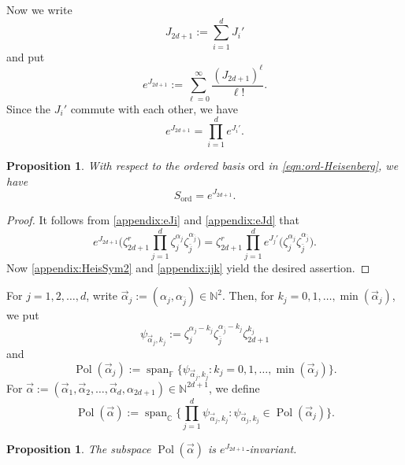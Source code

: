 \documentclass[a4paper,11pt,reqno]{amsart}
\newcommand{\0}{{\bf 0}}
\newcommand{\N}{\mathbb{N}}
\newcommand{\C}{\mathbb{C}}
\newcommand{\F}{\mathbb{F}}
\newcommand{\1}{{\bf 1}}
\DeclareMathOperator{\Span}{span}
\DeclareMathOperator{\Pol}{Pol}
\newcommand{\ord}{{\mathrm{ord}}}
\newcommand{\valpha}{\vec{\alpha}}
\theoremstyle{plain}
\newtheorem{proposition}[equation]{Proposition}
\theoremstyle{definition}
\numberwithin{equation}{section}
\theoremstyle{definition}
\begin{document}
\begin{appendices}
Now we write
\begin{equation*}
J_{2d+1}
:=
\sum_{i=1}^d J_i'
\end{equation*}
and put
\begin{equation*}
e^{J_{2d+1}}
:=\sum_{\ell=0}^\infty \frac{(J_{2d+1})^\ell}{\ell!}.
\end{equation*}
Since the $J_i'$ commute with each other, we have 
\begin{equation}\label{appendix:eJd}
e^{J_{2d+1}}=\prod_{i=1}^d e^{J_i'}.
\end{equation}

\begin{proposition}\label{appendix:eJU}
With respect to the ordered basis 
$\ord$ in \eqref{eqn:ord-Heisenberg}, 
we have
\begin{equation*}
S_{\ord} =e^{J_{2d+1}}.
\end{equation*}
\end{proposition}

\begin{proof}
It follows from \eqref{appendix:eJi} and \eqref{appendix:eJd} that 
\begin{equation*}
e^{J_{2d+1}}
\Big(
\zeta_{2d+1}^r
\prod_{j=1}^d
\zeta_j^{\alpha_j}\zeta_{\bar{j}}^{\alpha_{\bar{j}}}
\Big)
 = 
\zeta_{2d+1}^r
\prod_{j=1}^d
e^{J_{j}'}
\big(\zeta_j^{\alpha_j}\zeta_{\bar{j}}^{\alpha_{\bar{j}}}\big).
\end{equation*}
Now \eqref{appendix:HeisSym2} and \eqref{appendix:ijk} yield the desired assertion.
\end{proof}

For $j=1,2,\ldots, d$, 
write $\valpha_j:=(\alpha_j, \alpha_{\bar{j}}) \in \N^2$.
Then, for $k_j =0,1,\ldots, \min(\valpha_j)$, we put 
\begin{equation*}
\psi_{\valpha_j,k_j}
:=\zeta_j^{\alpha_j-k_j}\zeta_{\bar{j}}^{\alpha_{\bar{j}}-k_{j}}\zeta_{2d+1}^{k_j}
\end{equation*}
and
\begin{equation*}
\Pol(\valpha_j):=
\Span_\F\{\psi_{\valpha_j,k_j} : k_j = 0, 1,\ldots, \min(\valpha_j)\}.
\end{equation*}
For $\valpha:=(\valpha_1,\valpha_2,\ldots, \valpha_d, \alpha_{2d+1}) \in \N^{2d+1}$,
we define
\begin{equation*}
\Pol(\valpha)
:=\Span_{\C}\Big\{\prod_{j=1}^d \psi_{\valpha_j,k_j}: 
\psi_{\valpha_j,k_j} \in \Pol(\valpha_j)\Big\}.
\end{equation*}

\begin{proposition}\label{appendix:symU}
The subspace $\Pol(\valpha)$ is $e^{J_{2d+1}}$-invariant.
\end{proposition}


\end{appendices}
\end{document}
